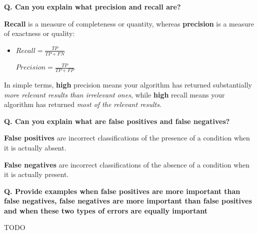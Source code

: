 \begin{frame}[fragile]{\textbf{Q. Can you explain what precision and recall are?}}
\begin{wideitemize}
  \item \textbf{Recall} is a measure of completeness or quantity, whereas
  \textbf{precision} is a measure of exactness or quality:\vspace{.2em}
  \begin{itemize}
    \item \parbox[t]{1.5in}{$Recall = \frac{TP}{TP + FN}$} \hspace{.3in}
      \parbox[t]{1.5in}{$Precision = \frac{TP}{TP + FP}$}
  \end{itemize}
  \item In simple terms, \textbf{high} precision means your algorithm has returned
  substantially \textit{more relevant results than irrelevant ones}, while
  \textbf{high} recall means your algorithm has returned \textit{most of the
  relevant results}.
\end{wideitemize}
\end{frame}



\begin{frame}[fragile]{\textbf{Q. Can you explain what are false positives and
false negatives?}}
\begin{wideitemize}
  \item \textbf{False positives} are incorrect classifications of the presence
  of a condition when it is actually absent.
  \item \textbf{False negatives} are incorrect classifications of the absence
  of a condition when it is actually present.
\end{wideitemize}
\end{frame}

\begin{frame}[fragile]{\textbf{Q. Provide examples when false positives are more
important than false negatives, false negatives are more important than false
positives and when these two types of errors are equally important}}
\begin{wideitemize}
  \item TODO
\end{wideitemize}
\end{frame}


